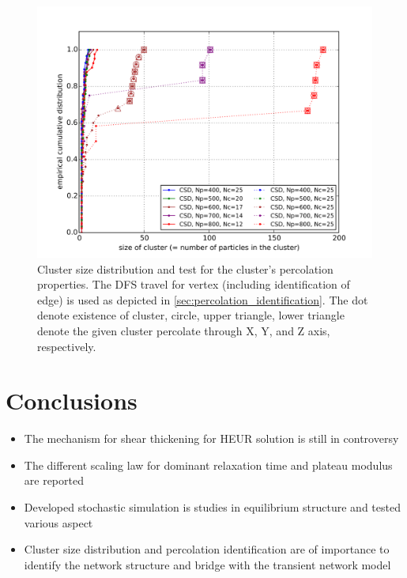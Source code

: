 \documentclass[10pt, a4paper]{article}
\begin{document}
\begin{figure}
  \centering
  \includegraphics[width=\textwidth]{figures/percolation_NP_dependency.png}
  \caption{Cluster size distribution and test for the cluster's percolation properties. The DFS travel for vertex (including identification of edge) is used as depicted in \ref{sec:percolation_identification}. The dot denote existence of cluster, circle, upper triangle, lower triangle denote the given cluster percolate through X, Y, and Z axis, respectively.}
  \label{fig:percolation_NP_dependency}
\end{figure}



\section{Conclusions}
\begin{itemize}
\item The mechanism for shear thickening for HEUR solution is still in controversy
\item The different scaling law for dominant relaxation time and plateau modulus are reported \textcite{Uneyama:2012ge}
\item Developed stochastic simulation is studies in equilibrium structure and tested various aspect
\item Cluster size distribution and percolation identification are of importance to identify the network structure and bridge with the transient network model
\end{itemize}
\end{document}
